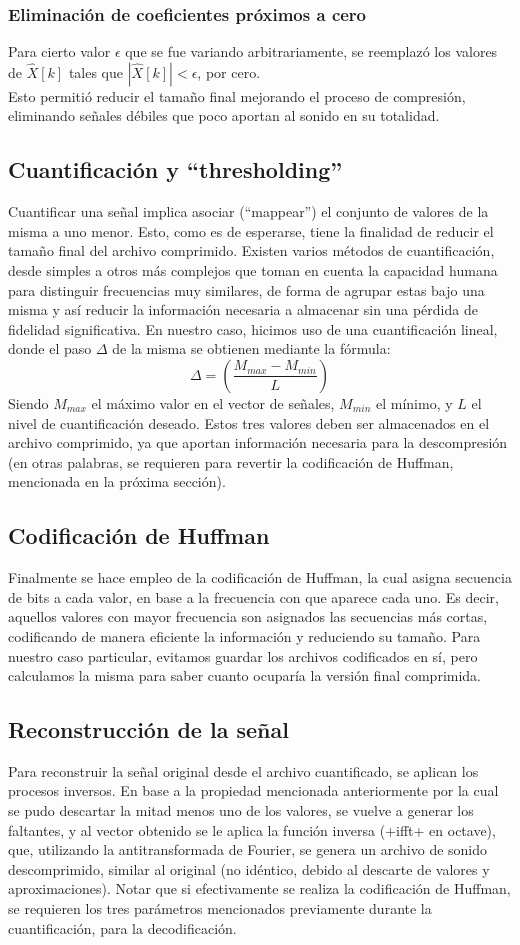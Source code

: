 \documentclass[a4paper,11pt]{article}
\begin{document}
\subsubsection{Eliminación de coeficientes próximos a cero}
Para cierto valor $\epsilon$ que se fue variando arbitrariamente, se reemplazó
los valores de $\hat{X}[k]$ tales que $|\hat{X}[k]| < \epsilon$, por cero. \\
Esto permitió reducir el tamaño final mejorando el proceso de compresión,
eliminando señales débiles que poco aportan al sonido en su totalidad.
\subsection{Cuantificación y ``thresholding''}
Cuantificar una señal implica asociar (``mappear'') el conjunto de valores de la
misma a uno menor. Esto, como es de esperarse, tiene la finalidad de
reducir el tamaño final del archivo comprimido. Existen varios métodos de
cuantificación, desde simples a otros más complejos que toman en cuenta la
capacidad humana para distinguir frecuencias muy similares, de forma de agrupar
estas bajo una misma y así reducir la información necesaria a almacenar sin una
pérdida de fidelidad significativa. En nuestro caso, hicimos uso de una
cuantificación lineal, donde el paso $\Delta$ de la misma se obtienen
mediante la fórmula:
$$\Delta = \left(\frac{M_{max} - M_{min}}{L}\right)$$
Siendo $M_{max}$ el máximo valor en el vector de señales, $M_{min}$ el mínimo,
y $L$ el nivel de cuantificación deseado.
Estos tres valores deben ser almacenados en el archivo comprimido, ya que
aportan información necesaria para la descompresión (en otras palabras, se
requieren para revertir la codificación de Huffman, mencionada en la próxima
sección).
\subsection{Codificación de Huffman}
Finalmente se hace empleo de la codificación de Huffman, la cual asigna
secuencia de bits a cada valor, en base a la frecuencia con que aparece cada
uno. Es decir, aquellos valores con mayor frecuencia son asignados las
secuencias más cortas, codificando de manera eficiente la información y
reduciendo su tamaño.
Para nuestro caso particular, evitamos guardar los archivos codificados en sí,
pero calculamos la misma para saber cuanto ocuparía la versión final
comprimida.
\subsection{Reconstrucción de la señal}
Para reconstruir la señal original desde el archivo cuantificado, se aplican los
procesos inversos. En base a la propiedad mencionada anteriormente por la cual
se pudo descartar la mitad menos uno de los valores, se vuelve a generar los
faltantes, y al vector obtenido se le aplica la función inversa (\verbatim+ifft+
en octave), que, utilizando la antitransformada de Fourier, se genera un archivo
de sonido descomprimido, similar al original (no idéntico, debido al descarte de
valores y aproximaciones). Notar que si efectivamente se realiza la
codificación de Huffman, se requieren los tres parámetros mencionados
previamente durante la cuantificación, para la decodificación.
\end{document}
